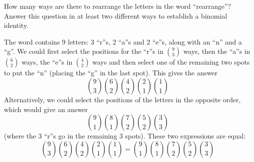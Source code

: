\begin{questions}
\begin{answer}
	\end{answer}
	
	
	
\question How many ways are there to rearrange the letters in the word ``rearrange''? 	Answer this question in at least two different ways to establish a binomial identity.

	\begin{answer}
		The word contains 9 letters: 3 ``r''s, 2 ``a''s and 2 ``e''s, along with an ``n'' and a ``g''.  We could first select the positions for the ``r''s in ${9 \choose 3}$ ways, then the ``a''s in ${6 \choose 2}$ ways, the ``e''s in ${4 \choose 2}$ ways and then select one of the remaining two spots to put the ``n'' (placing the ``g'' in the last spot).  This gives the answer
		\[{9 \choose 3}{6 \choose 2}{4 \choose 2}{2\choose 1}{1\choose 1}\]
		Alternatively, we could select the positions of the letters in the opposite order, which would give an answer
		\[{9 \choose 1}{8\choose 1}{7 \choose 2}{5\choose 2}{3\choose 3}\]
		(where the 3 ``r''s go in the remaining 3 spots).  These two expressions are equal:
		\[{9 \choose 3}{6 \choose 2}{4 \choose 2}{2\choose 1}{1\choose 1} = {9 \choose 1}{8\choose 1}{7 \choose 2}{5\choose 2}{3\choose 3}\]
	\end{answer}
	

\end{questions}
